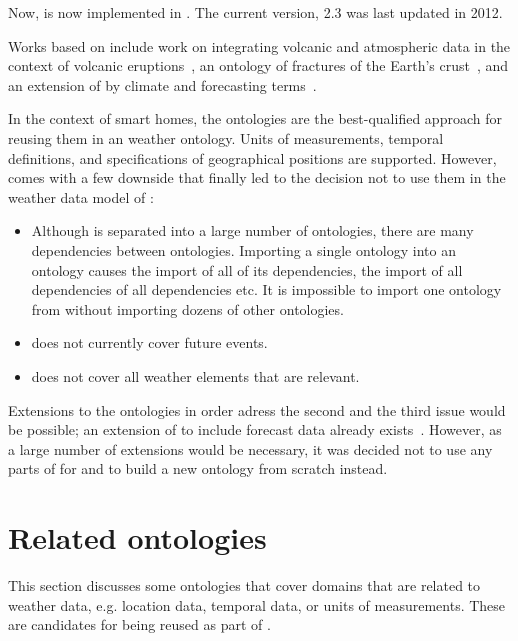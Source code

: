 Now,  is now implemented in . The current version,  2.3 was last updated in 2012.

Works based on  include work on integrating volcanic and atmospheric data in the context of volcanic eruptions~\cite{sweet_example1}, an ontology of fractures of the Earth's crust~\cite{sweet_example2}, and an extension of  by climate and forecasting terms~\cite{sweet_example3}.

In the context of smart homes, the  ontologies are the best-qualified approach for reusing them in an weather ontology. Units of measurements, temporal definitions, and specifications of geographical positions are supported. However,  comes with a few downside that finally led to the decision not to use them in the weather data model of \thinkhome:
\begin{itemize}
  \item Although  is separated into a large number of ontologies, there are many dependencies between ontologies. Importing a single ontology into an  ontology causes the import of all of its dependencies, the import of all dependencies of all dependencies etc. It is impossible to import one ontology from  without importing dozens of other ontologies.
  
  \item {} does not currently cover future events.
  
  \item {} does not cover all weather elements that are relevant.
\end{itemize}

Extensions to the  ontologies in order adress the second and the third issue would be possible; an extension of  to include forecast data already exists~\cite{sweet_example3}. However, as a large number of extensions would be necessary, it was decided not to use any parts of  for \thinkhome and to build a new ontology from scratch instead.

\section{Related ontologies}
\label{sec:related_ontologies}

This section discusses some ontologies that cover domains that are related to weather data, e.g. location data, temporal data, or units of measurements. These are candidates for being reused as part of \smarthomeweather.

